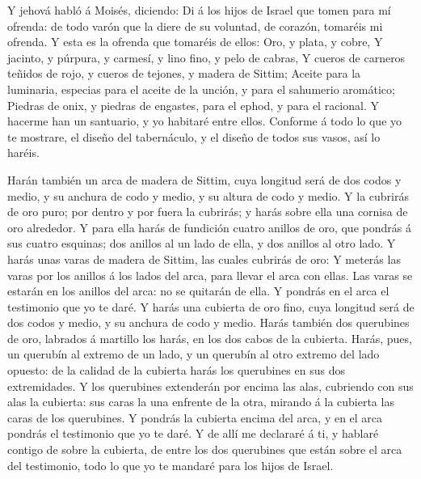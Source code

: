  Y jehová habló á Moisés, diciendo:  Di á los
hijos de Israel que tomen para mí ofrenda: de todo varón que la diere de
su voluntad, de corazón, tomaréis mi ofrenda.  Y esta es la
ofrenda que tomaréis de ellos: Oro, y plata, y cobre,  Y
jacinto, y púrpura, y carmesí, y lino fino, y pelo de cabras,
 Y cueros de carneros teñidos de rojo, y cueros de tejones,
y madera de Sittim;  Aceite para la luminaria, especias para
el aceite de la unción, y para el sahumerio aromático; 
Piedras de onix, y piedras de engastes, para el ephod, y para el
racional.  Y hacerme han un santuario, y yo habitaré entre
ellos.  Conforme á todo lo que yo te mostrare, el diseño del
tabernáculo, y el diseño de todos sus vasos, así lo haréis.

 Harán también un arca de madera de Sittim, cuya longitud
será de dos codos y medio, y su anchura de codo y medio, y su altura de
codo y medio.  Y la cubrirás de oro puro; por dentro y por
fuera la cubrirás; y harás sobre ella una cornisa de oro alrededor.
 Y para ella harás de fundición cuatro anillos de oro, que
pondrás á sus cuatro esquinas; dos anillos al un lado de ella, y dos
anillos al otro lado.  Y harás unas varas de madera de
Sittim, las cuales cubrirás de oro:  Y meterás las varas
por los anillos á los lados del arca, para llevar el arca con ellas.
 Las varas se estarán en los anillos del arca: no se
quitarán de ella.  Y pondrás en el arca el testimonio que
yo te daré.  Y harás una cubierta de oro fino, cuya
longitud será de dos codos y medio, y su anchura de codo y medio.
 Harás también dos querubines de oro, labrados á martillo
los harás, en los dos cabos de la cubierta.  Harás, pues,
un querubín al extremo de un lado, y un querubín al otro extremo del
lado opuesto: de la calidad de la cubierta harás los querubines en sus
dos extremidades.  Y los querubines extenderán por encima
las alas, cubriendo con sus alas la cubierta: sus caras la una enfrente
de la otra, mirando á la cubierta las caras de los querubines.
 Y pondrás la cubierta encima del arca, y en el arca
pondrás el testimonio que yo te daré.  Y de allí me
declararé á ti, y hablaré contigo de sobre la cubierta, de entre los dos
querubines que están sobre el arca del testimonio, todo lo que yo te
mandaré para los hijos de Israel.

